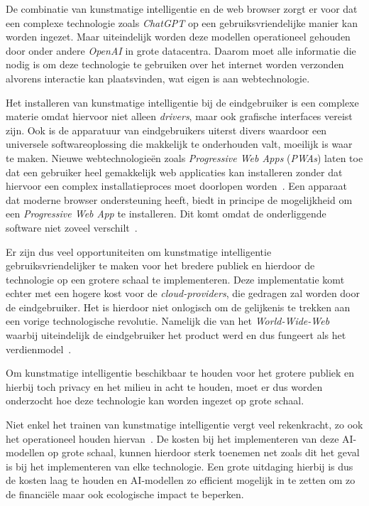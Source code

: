 \bigbreak{}

De combinatie van kunstmatige intelligentie en de web browser zorgt er voor dat een complexe technologie zoals \textit{ChatGPT} op een gebruiksvriendelijke manier kan worden ingezet. Maar uiteindelijk worden deze modellen operationeel gehouden door onder andere \textit{OpenAI} in grote datacentra. Daarom moet alle informatie die nodig is om deze technologie te gebruiken over het internet worden verzonden alvorens interactie kan plaatsvinden, wat eigen is aan webtechnologie.

\bigbreak{}

Het installeren van kunstmatige intelligentie bij de eindgebruiker is een complexe materie omdat hiervoor niet alleen \textit{drivers}, maar ook grafische interfaces vereist zijn. Ook is de apparatuur van eindgebruikers uiterst divers waardoor een universele softwareoplossing die makkelijk te onderhouden valt, moeilijk is waar te maken. Nieuwe webtechnologieën zoals \textit{Progressive Web Apps} (\textit{PWAs}) laten toe dat een gebruiker heel gemakkelijk web applicaties kan installeren zonder dat hiervoor een complex installatieproces moet doorlopen worden~\autocite{Pekala2023}. Een apparaat dat moderne browser ondersteuning heeft, biedt in principe de mogelijkheid om een \textit{Progressive Web App} te installeren. Dit komt omdat de onderliggende software niet zoveel verschilt~\autocite{Todavchich2019}.

\bigbreak{}

Er zijn dus veel opportuniteiten om kunstmatige intelligentie gebruiksvriendelijker te maken voor het bredere publiek en hierdoor de technologie op een grotere schaal te implementeren. Deze implementatie komt echter met een hogere kost voor de \textit{cloud-providers}, die gedragen zal worden door de eind\-ge\-brui\-ker. Het is hierdoor niet onlogisch om de gelijkenis te trekken aan een vorige technologische revolutie. Namelijk die van het \textit{World-Wide-Web} waarbij uiteindelijk de eind\-ge\-brui\-ker het product werd en dus fungeert als het verdienmodel~\autocite{quoteresearch2017, OKO2019}.

\bigbreak{}

Om kunstmatige intelligentie beschikbaar te houden voor het grotere publiek en hierbij toch privacy en het milieu in acht te houden, moet er dus worden onderzocht hoe deze technologie kan worden ingezet op grote schaal.

\bigbreak{}

Niet enkel het trainen van kunstmatige intelligentie vergt veel rekenkracht, zo ook het operationeel houden hiervan~\autocite{Patel2023}. De kosten bij het implementeren van deze AI-modellen op grote schaal, kunnen hierdoor sterk toenemen net zoals dit het geval is bij het implementeren van elke technologie. Een grote uitdaging hierbij is dus de kosten laag te houden en AI-modellen zo efficient mogelijk in te zetten om zo de financiële maar ook ecologische impact te beperken.

